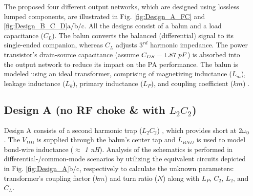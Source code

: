 \documentclass[conference]{IEEEtran}
\begin{document}
\color{blue} The proposed four different  output networks, which are designed using lossless lumped components, are illustrated in Fig. \ref{fig:Design_A_FC} and \ref{fig:Design_B_C_D}a/b/c. \color{black} 
All the designs \color{blue}  consist of \color{black} a balun and a load capacitance ($C_L$)\color{blue}. The balun converts the balanced (differential) signal to its single-ended companion, whereas $C_L$ adjusts $3^{rd}$ harmonic impedance. The power transistor's drain-source \color{black}  capacitance (assume $C_{DS}=1.87\hspace{1mm}pF$) is absorbed into the output network to reduce its impact on the PA performance. The balun is modeled using \color{blue} an \color{black} ideal transformer, \color{blue} comprising of \color{black} magnetizing inductance ($L_m$), leakage inductance ($L_k$), primary inductance ($L_P$)\color{blue}, \color{black} and coupling coefficient ($km$) \cite{Transformer_model}. 

\subsection{Design A (no RF choke \& with $L_2C_2$)}
Design A consists of a second harmonic trap ($L_2C_2$) \color{blue},\color{black} which provides short at $2\omega_0$. The $V_{DD}$ is \color{blue} supplied through the balun's center tap \color{black} and $L_{BND}$ is used to model bond-wire inductance ($\approx$ \textit{1 nH}).
Analysis of the schematics is \color{blue} performed in differential-/common-mode scenarios by utilizing the equivalent circuits depicted in Fig. \ref{fig:Design_A}b/c, respectively\color{black} to calculate the unknown parameters: \color{blue} transformer's coupling factor ($km$) and turn ratio ($N$) along with \color{black} $L_P$, $C_2$, $L_2$, and $C_L$.
\end{document}
